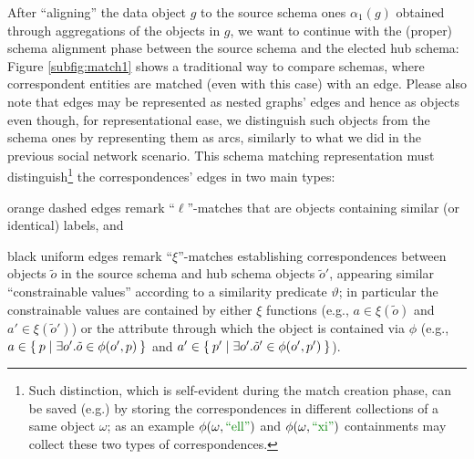 \begin{example}[continues=ex:examplegraphdata,label=ex:examplereferencedOcaml]
After ``aligning'' the data object $g$ to the source schema ones $\alpha_1(g)$ obtained through aggregations of the objects in $g$, we want to continue with the (proper) schema alignment phase between the source schema and the elected hub schema: Figure \vref{subfig:match1} shows a traditional way to compare schemas, where correspondent entities are matched (even with this case) with an edge. Please also note that edges may be represented as nested graphs' edges and hence as objects even though, for representational ease, we distinguish such objects from the schema ones by representing them as arcs, similarly to what we did in the previous social network scenario. This schema matching representation must  distinguish\footnote{Such distinction, which is self-evident during the match creation phase, can be saved (e.g.) by storing the correspondences in different collections of a same object $\omega$; as an example $\phi(\omega,\mstr{ell})$ and $\phi(\omega,\mstr{xi})$ containments may collect these two types of correspondences.} the correspondences' edges in two main types: 
\begin{myalist}
\item orange dashed edges remark ``$\ell$''-matches that are objects containing similar (or identical) labels, and 
\item black uniform edges remark ``$\xi$''-matches establishing correspondences between %
objects $\tilde{o}$ in the source schema %
 and hub schema objects $\tilde{o}'$, appearing similar ``constrainable values''  according to a similarity predicate $\vartheta$; in particular the constrainable values are contained by either $\xi$ functions (e.g.,  $a\in\xi(\tilde{o})$ and $a'\in\xi(\tilde{o}')$) or the attribute through which the object is contained via $\phi$  (e.g., $a\in\Set{p| \exists o'.\tilde{o}\in \phi(o',p)}$ and $a'\in\Set{p'| \exists o'.\tilde{o}'\in \phi(o',p')}$).
\end{myalist}

\end{example}
